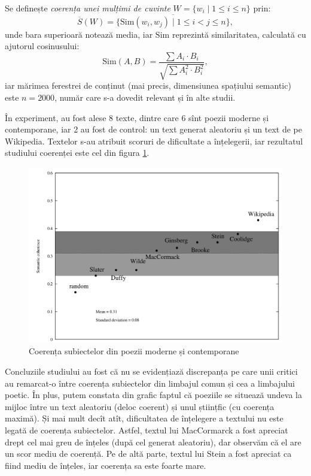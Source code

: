\documentclass[a4paper]{article}
\newcommand\dr{\mathrm}
\begin{document}
Se definește \emph{coerența unei mulțimi de cuvinte}
$ W = \{ w_i \mid 1 \leq i \leq n \} $
prin:
\[
  \overline{S}(W) = \overline{ \{ \dr{Sim}(w_i, w_j) \mid 1 \leq i < j \leq n \} },
\]
unde bara superioară notează media, iar $ \dr{Sim} $ reprezintă similaritatea,
calculată cu ajutorul cosinusului:
\[
  \dr{Sim}(A, B) = \dfrac{\sum A_i \cdot B_i}{\sqrt{\sum A_i^2 \cdot B_i^2}},
\]
iar mărimea ferestrei de conținut (mai precis, dimensiunea spațiului semantic)
este $ n = 2000 $, număr care s-a dovedit relevant și în alte studii.

În experiment, au fost alese 8 texte, dintre care 6 sînt poezii moderne și
contemporane, iar 2 au fost de control: un text generat aleatoriu și un text
de pe Wikipedia. Textelor s-au atribuit scoruri de dificultate a înțelegerii,
iar rezultatul studiului coerenței este cel din figura \ref{fig:coe}.

\begin{figure}[!htb]
  \centering
  \includegraphics[scale=0.2]{img/coherence1.png}
  \caption{Coerența subiectelor din poezii moderne și contemporane}
  \label{fig:coe}
\end{figure}

Concluziile studiului au fost că nu se evidențiază discrepanța pe care unii
critici au remarcat-o între coerența subiectelor din limbajul comun
și cea a limbajului poetic. În plus, putem constata din grafic faptul că
poeziile se situează undeva la mijloc între un text aleatoriu (deloc coerent)
și unul științfic (cu coerența maximă). Și mai mult decît atît, dificultatea
de înțelegere a textului nu este legată de coerența subiectelor. Astfel,
textul lui MacCormarck a fost apreciat drept cel mai greu de înțeles
(după cel generat aleatoriu), dar observăm că el are un scor mediu de coerență.
Pe de altă parte, textul lui Stein a fost apreciat ca fiind mediu de înțeles,
iar coerența sa este foarte mare.
\end{document}

